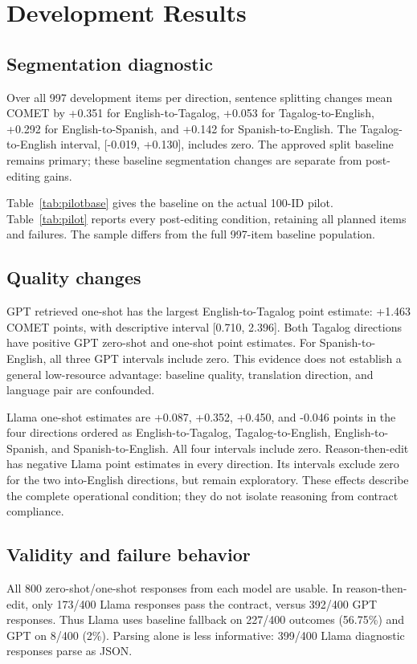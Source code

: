 \section{Development Results}
\subsection{Segmentation diagnostic}
Over all 997 development items per direction, sentence splitting changes mean COMET by +0.351 for English-to-Tagalog, +0.053 for Tagalog-to-English, +0.292 for English-to-Spanish, and +0.142 for Spanish-to-English. The Tagalog-to-English interval, [-0.019, +0.130], includes zero. The approved split baseline remains primary; these baseline segmentation changes are separate from post-editing gains.


Table~\ref{tab:pilotbase} gives the baseline on the actual 100-ID pilot. Table~\ref{tab:pilot} reports every post-editing condition, retaining all planned items and failures. The sample differs from the full 997-item baseline population.


\subsection{Quality changes}
GPT retrieved one-shot has the largest English-to-Tagalog point estimate: +1.463 COMET points, with descriptive interval [0.710, 2.396]. Both Tagalog directions have positive GPT zero-shot and one-shot point estimates. For Spanish-to-English, all three GPT intervals include zero. This evidence does not establish a general low-resource advantage: baseline quality, translation direction, and language pair are confounded.

Llama one-shot estimates are +0.087, +0.352, +0.450, and -0.046 points in the four directions ordered as English-to-Tagalog, Tagalog-to-English, English-to-Spanish, and Spanish-to-English. All four intervals include zero. Reason-then-edit has negative Llama point estimates in every direction. Its intervals exclude zero for the two into-English directions, but remain exploratory. These effects describe the complete operational condition; they do not isolate reasoning from contract compliance.

\subsection{Validity and failure behavior}
All 800 zero-shot/one-shot responses from each model are usable. In reason-then-edit, only 173/400 Llama responses pass the contract, versus 392/400 GPT responses. Thus Llama uses baseline fallback on 227/400 outcomes (56.75\%) and GPT on 8/400 (2\%). Parsing alone is less informative: 399/400 Llama diagnostic responses parse as JSON.

